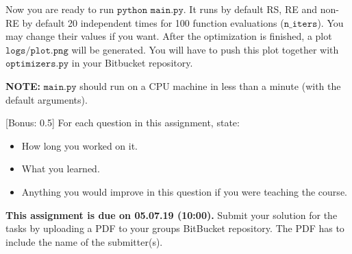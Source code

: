 \documentclass{exam}
\newcommand{\duedate}{05.07.19 (10:00)}
\newcommand{\due}{{\bf This assignment is due on \duedate.} }
\begin{document}
\begin{questions}
		Now you are ready to run $\texttt{python main.py}$. It runs by default RS, RE and non-RE by default 20 independent times for 100 function evaluations ($\texttt{n\_iters}$). You may change their values if you want. After the optimization is finished, a plot $\texttt{logs/plot.png}$ will be generated. You will have to push this plot together with $\texttt{optimizers.py}$ in your Bitbucket repository.
		
		\textbf{NOTE:} $\texttt{main.py}$ should run on a CPU machine in less than a minute (with the default arguments).

		[Bonus: 0.5]
		For each question in this assignment, state:
		\begin{itemize}
			\item How long you worked on it.
			\item What you learned.
			\item Anything you would improve in this question if you were teaching the course.
		\end{itemize}
	\end{questions}
	
	\noindent
	\due Submit your solution for the tasks by uploading a PDF to your groups BitBucket repository. The PDF has to include the name of the submitter(s).
\end{document}
